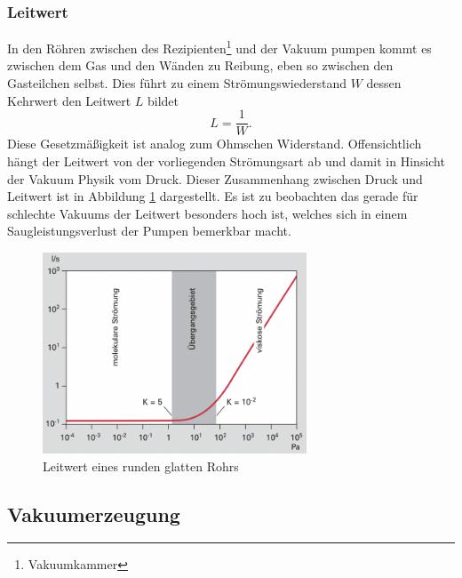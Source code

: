 \subsubsection*{Leitwert}
In den Röhren zwischen des Rezipienten\footnote{Vakuumkammer} und der Vakuum pumpen kommt es zwischen dem Gas 
und den Wänden zu Reibung, eben so zwischen den Gasteilchen selbst.
Dies führt zu einem Strömungswiederstand $W$ dessen Kehrwert den Leitwert $L$ bildet
\begin{equation}
    L = \frac{1}{W}.
\end{equation}
Diese Gesetzmäßigkeit ist analog zum Ohmschen Widerstand.
Offensichtlich hängt der Leitwert von der vorliegenden Strömungsart ab
und damit in Hinsicht der Vakuum Physik vom Druck.
Dieser Zusammenhang zwischen Druck und Leitwert ist in Abbildung \ref{fig:leitwert} dargestellt.
Es ist zu beobachten das gerade für schlechte Vakuums der Leitwert besonders hoch ist,
welches sich in einem Saugleistungsverlust der Pumpen bemerkbar macht.
\begin{figure}[h]
    \centering
    \includegraphics[width=0.7\textwidth]{abb/leitwert.png}
    \caption{Leitwert eines runden glatten Rohrs \cite{Pfeifer}} 
    \label{fig:leitwert}
\end{figure} 



\subsection{Vakuumerzeugung}
